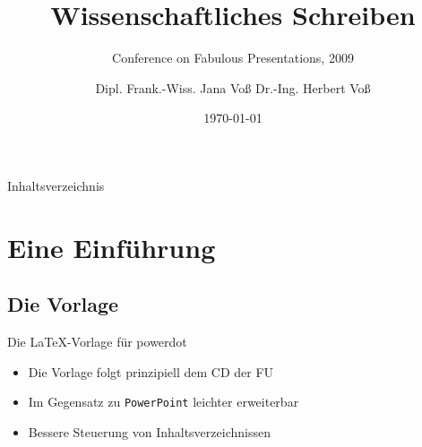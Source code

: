 \documentclass[style=BerlinFU]{powerdot}
\begin{document}
\title{Wissenschaftliches Schreiben}
\subtitle{Conference on Fabulous Presentations, 2009}
\author{Dipl. Frank.-Wiss. Jana Voß \quad Dr.-Ing. Herbert Voß}
\date{\today}
\maketitle

\begin{slide}[toc=]{Inhaltsverzeichnis}
\tableofcontents
\end{slide}

\section{Eine Einführung}
\subsection{Die Vorlage}
\begin{slide}{Die \LaTeX-Vorlage für powerdot}
\begin{itemize}[type=1]
\item Die Vorlage folgt prinzipiell dem CD der FU
\item Im Gegensatz zu \texttt{PowerPoint} leichter erweiterbar
\item Bessere Steuerung von Inhaltsverzeichnissen
\end{itemize}
\end{slide}
\end{document}
